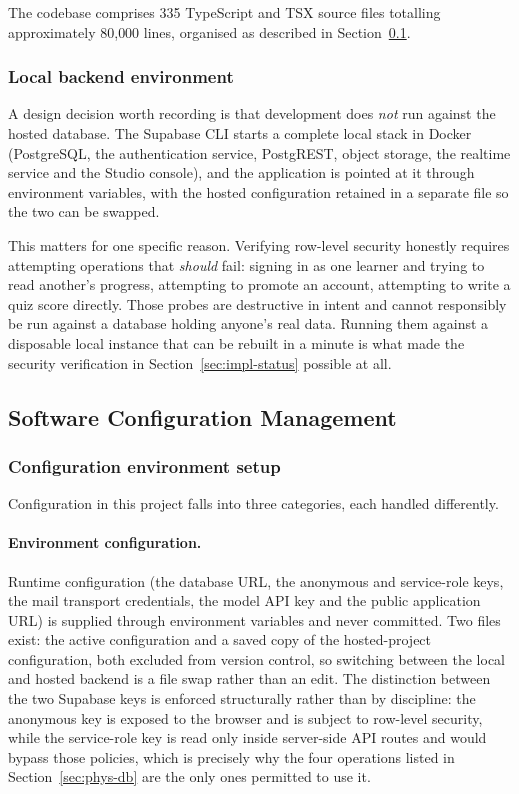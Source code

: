\documentclass[12pt, oneside]{article} %
\begin{document}
The codebase comprises 335 TypeScript and TSX source files totalling approximately 80{,}000 lines, organised as described in Section~\ref{sec:impl-scm}.

\subsubsection{Local backend environment}

A design decision worth recording is that development does \emph{not} run against the hosted database. The Supabase CLI starts a complete local stack in Docker (PostgreSQL, the authentication service, PostgREST, object storage, the realtime service and the Studio console), and the application is pointed at it through environment variables, with the hosted configuration retained in a separate file so the two can be swapped.

This matters for one specific reason. Verifying row-level security honestly requires attempting operations that \emph{should} fail: signing in as one learner and trying to read another's progress, attempting to promote an account, attempting to write a quiz score directly. Those probes are destructive in intent and cannot responsibly be run against a database holding anyone's real data. Running them against a disposable local instance that can be rebuilt in a minute is what made the security verification in Section~\ref{sec:impl-status} possible at all.

\subsection{Software Configuration Management}
\label{sec:impl-scm}

\subsubsection{Configuration environment setup}

Configuration in this project falls into three categories, each handled differently.

\paragraph{Environment configuration.} Runtime configuration (the database URL, the anonymous and service-role keys, the mail transport credentials, the model API key and the public application URL) is supplied through environment variables and never committed. Two files exist: the active configuration and a saved copy of the hosted-project configuration, both excluded from version control, so switching between the local and hosted backend is a file swap rather than an edit. The distinction between the two Supabase keys is enforced structurally rather than by discipline: the anonymous key is exposed to the browser and is subject to row-level security, while the service-role key is read only inside server-side API routes and would bypass those policies, which is precisely why the four operations listed in Section~\ref{sec:phys-db} are the only ones permitted to use it.
\end{document}
